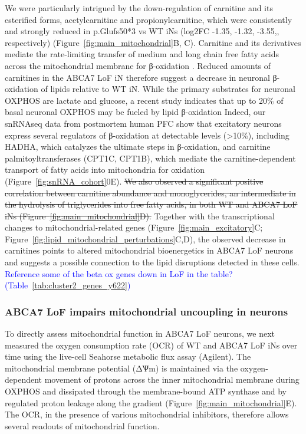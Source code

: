 We were particularly intrigued by the down-regulation of carnitine and its esterified forms, acetylcarnitine and propionylcarnitine, which were consistently and strongly reduced in p.Glufs50*3 vs WT iNs  (log2FC -1.35, -1.32, -3.55,, respectively) (Figure~\ref{fig:main_mitochondrial}B, C). Carnitine and its derivatives mediate the rate-limiting transfer of medium and long chain free fatty acids across the mitochondrial membrane for β-oxidation \cite{noauthor_2016-la,noauthor_2004-tm}. Reduced amounts of carnitines in the ABCA7 LoF iN therefore suggest a decrease in neuronal β-oxidation of lipids relative to WT iN. While the primary substrates for neuronal OXPHOS are lactate and glucose\cite{Dienel2018-dt,Trigo2022-ym,Yellen2018-kr}, a recent study indicates that up to 20\% of basal neuronal OXPHOS may be fueled by lipid β-oxidation\cite{Morant-Ferrando2023-va} Indeed, our snRNAseq data from postmortem human PFC show that excitatory neurons express several regulators of β-oxidation at detectable levels (>10\%), including HADHA, which catalyzes the ultimate steps in β-oxidation, and carnitine palmitoyltransferases (CPT1C, CPT1B), which mediate the carnitine-dependent transport of fatty acids into mitochondria for oxidation (Figure~\ref{fig:snRNA_cohort}0E). \sout{We also observed a significant positive correlation between carnitine abundance and monoglycerides, an intermediate in the hydrolysis of triglycerides into free fatty acids, in both WT and ABCA7 LoF iNs (Figure~\ref{fig:main_mitochondrial}D).} Together with the transcriptional changes to mitochondrial-related genes (Figure~\ref{fig:main_excitatory}C; Figure~\ref{fig:lipid_mitochondrial_perturbations}C,D), the observed decrease in carnitines  points to altered mitochondrial bioenergetics in ABCA7 LoF neurons and suggests a possible connection to the lipid disruptions detected in these cells. \textcolor{blue}{Reference some of the beta ox genes down in LoF in the table? (Table~\ref{tab:cluster2_genes_y622})}

\subsubsection{ABCA7 LoF impairs mitochondrial uncoupling in neurons}
To directly assess mitochondrial function in ABCA7 LoF neurons, we next measured the oxygen consumption rate (OCR) of WT and ABCA7 LoF iNs over time using the live-cell Seahorse metabolic flux assay (Agilent). The mitochondrial membrane potential (ΔѰm) is maintained via the oxygen-dependent movement of protons across the inner mitochondrial membrane during OXPHOS and dissipated through the membrane-bound ATP synthase and by regulated proton leakage along the gradient (Figure~\ref{fig:main_mitochondrial}E). The OCR, in the presence of various mitochondrial inhibitors, therefore allows several readouts of mitochondrial function\cite{Divakaruni2014-eq}.

